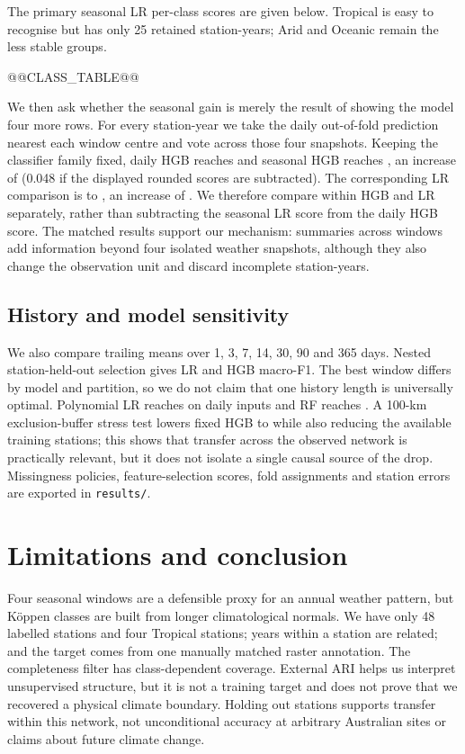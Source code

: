 \documentclass{article}
\begin{document}
The primary seasonal LR per-class scores are given below. Tropical is easy to recognise but has only 25 retained station-years; Arid and Oceanic remain the less stable groups.

@@CLASS_TABLE@@

We then ask whether the seasonal gain is merely the result of showing the model four more rows. For every station-year we take the daily out-of-fold prediction nearest each window centre and vote across those four snapshots. Keeping the classifier family fixed, daily HGB reaches \MatchedDaily{} and seasonal HGB reaches \SeasonHGB{}, an increase of \SeasonGain{} (0.048 if the displayed rounded scores are subtracted). The corresponding LR comparison is \MatchedLR{} to \SeasonLR{}, an increase of \SeasonLRGain{}. We therefore compare within HGB and LR separately, rather than subtracting the seasonal LR score from the daily HGB score. The matched results support our mechanism: summaries across windows add information beyond four isolated weather snapshots, although they also change the observation unit and discard incomplete station-years.

\subsection{History and model sensitivity}
We also compare trailing means over 1, 3, 7, 14, 30, 90 and 365 days. Nested station-held-out selection gives LR \HistoryLR{} and HGB \HistoryHGB{} macro-F1. The best window differs by model and partition, so we do not claim that one history length is universally optimal. Polynomial LR reaches \DailyPoly{} on daily inputs and RF reaches \DailyRF{}. A 100-km exclusion-buffer stress test lowers fixed HGB to \SpatialHGB{} while also reducing the available training stations; this shows that transfer across the observed network is practically relevant, but it does not isolate a single causal source of the drop. Missingness policies, feature-selection scores, fold assignments and station errors are exported in \texttt{results/}.

\section{Limitations and conclusion}
Four seasonal windows are a defensible proxy for an annual weather pattern, but Köppen classes are built from longer climatological normals. We have only 48 labelled stations and four Tropical stations; years within a station are related; and the target comes from one manually matched raster annotation. The completeness filter has class-dependent coverage. External ARI helps us interpret unsupervised structure, but it is not a training target and does not prove that we recovered a physical climate boundary. Holding out stations supports transfer within this network, not unconditional accuracy at arbitrary Australian sites or claims about future climate change.
\end{document}
